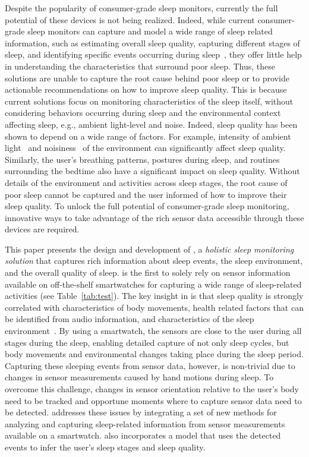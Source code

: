 Despite the popularity of consumer-grade sleep monitors, currently the full potential of these devices is not being realized. Indeed, while current consumer-grade sleep monitors can capture and model a wide range of sleep related information, such as estimating overall sleep quality, capturing different stages of sleep, and identifying specific events occurring during
sleep~\cite{kay2012lullaby,zhang2013real,sleepmonitor}, they offer little help in understanding the characteristics that surround poor sleep. Thus, these solutions are unable to capture the root cause behind poor sleep or to provide {actionable} recommendations on how to improve sleep quality. This is because current solutions focus on monitoring characteristics of the sleep itself, without considering behaviors occurring during sleep and the environmental context affecting sleep, e.g., ambient light-level and noise. Indeed, sleep quality has been shown to depend on a wide range of factors. For example, intensity of ambient light~\cite{hood04determinants} and noisiness~\cite{muzet2007environmental} of the environment can significantly affect sleep quality. Similarly, the user's breathing patterns, postures during sleep, and routines surrounding the bedtime also have a significant impact on sleep quality. Without details of the environment and activities across sleep stages, the root cause of poor sleep cannot be captured and the user informed of how to improve their sleep quality. To unlock the full potential of consumer-grade sleep monitoring, innovative ways to take advantage of the rich sensor data accessible through these devices are required.

This paper presents the design and development of {\systemname}, a \emph{holistic sleep monitoring solution} that captures rich information
about sleep events, the sleep environment, and the overall quality of sleep. {\systemname} is the first to solely rely on sensor
information available on off-the-shelf smartwatches for capturing a wide range of sleep-related activities (see Table~\ref{tab:test}). The
key insight in {\systemname} is that sleep quality is strongly correlated with characteristics of body movements, health related factors
that can be identified from audio information, and characteristics of the sleep environment~\cite{shelgikar2016sleep}. By using a
smartwatch, the sensors are close to the user during all stages during the sleep, enabling detailed capture of not only sleep cycles, but
body movements and environmental changes taking place during the sleep period. Capturing these sleeping events from sensor data, however,
is non-trivial due to changes in sensor measurements caused by hand motions during sleep. To overcome this challenge, changes in sensor
orientation relative to the user's body need to be tracked and opportune moments where to capture sensor data need to be detected.
{\systemname} addresses these issues by integrating a set of new methods for analyzing and capturing sleep-related information from sensor
measurements available on a smartwatch. {\systemname} also incorporates a model that uses the detected events to infer the user's sleep
stages and sleep quality.

